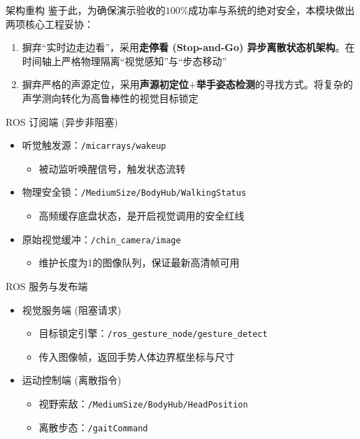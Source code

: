 \documentclass{beamer}
\begin{document}
    \begin{frame}{架构重构}
        鉴于此，为确保演示验收的$100\%$成功率与系统的绝对安全，本模块做出两项核心工程妥协：
        \begin{enumerate}
            \item[(1).] 摒弃“实时边走边看”，采用\textbf{走停看 (Stop-and-Go) 异步离散状态机架构}。在时间轴上严格物理隔离“视觉感知”与“步态移动”
            \item[(2).] 摒弃严格的声源定位，采用\textbf{声源初定位$+$举手姿态检测}的寻找方式。将复杂的声学测向转化为高鲁棒性的视觉目标锁定
        \end{enumerate}
    \end{frame}

    \begin{frame}{ROS 订阅端 (异步非阻塞) }
        \begin{itemize}
            \item 听觉触发源：\texttt{/micarrays/wakeup}
            \begin{itemize}
                \item 被动监听唤醒信号，触发状态流转
            \end{itemize}
            \item 物理安全锁：\texttt{/MediumSize/BodyHub/WalkingStatus}
            \begin{itemize}
                \item 高频缓存底盘状态，是开启视觉调用的安全红线
            \end{itemize}
            \item 原始视觉缓冲：\texttt{/chin\_camera/image}
            \begin{itemize}
                \item 维护长度为1的图像队列，保证最新高清帧可用
            \end{itemize}
        \end{itemize}
    \end{frame}

    \begin{frame}{ROS 服务与发布端}
        \begin{itemize}
            \item 视觉服务端 (阻塞请求) 
            \begin{itemize}
                \item 目标锁定引擎：\texttt{/ros\_gesture\_node/gesture\_detect}
                \item 传入图像帧，返回手势人体边界框坐标与尺寸
            \end{itemize}
            \item 运动控制端 (离散指令) 
            \begin{itemize}
                \item 视野索敌：\texttt{/MediumSize/BodyHub/HeadPosition}
                \item 离散步态：\texttt{/gaitCommand}
            \end{itemize}
        \end{itemize}
    \end{frame}
\end{document}
